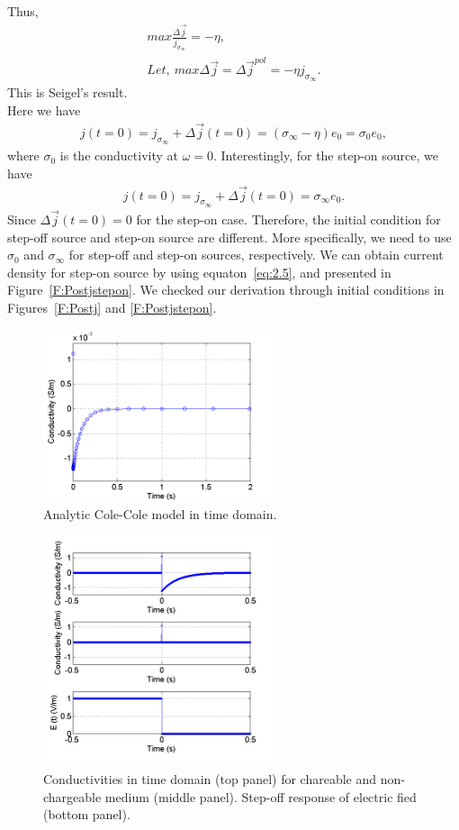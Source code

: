 \documentclass[a4paper, 11pt]{article}
\renewcommand {\j}  { {\vec j} }
\begin{document}
 Thus, 
\begin{align}
	max \frac{\Delta \j}{j_{\sigma_{\infty}}} = -\eta, \\
	Let,\ max \Delta \j = \Delta \j^{pol} = -\eta j_{\sigma_{\infty}}.
\end{align}
This is Seigel's result. \\
Here we have 
\begin{align}
	j(t=0)= j_{\sigma_{\infty}}+\Delta \j(t=0) = (\sigma_{\infty}-\eta)e_0 = \sigma_0e_0,
\end{align}
where $\sigma_0$ is the conductivity at $\omega=0$.
Interestingly, for the step-on source, we have
\begin{align}
	j(t=0)= j_{\sigma_{\infty}}+\Delta \j(t=0) = \sigma_{\infty}e_0.
\end{align}
Since $\Delta \j(t=0)=0$ for the step-on case. Therefore, the initial condition for step-off source and step-on source are different. More specifically, we need to use $\sigma_0$ and $\sigma_{\infty}$ for step-off and step-on sources, respectively. We can obtain current density for step-on source by using equaton~\ref{eq:2.5}, and presented in Figure~\ref{F:Postjstepon}. We checked our derivation through initial conditions in Figures~\ref{F:Postj} and \ref{F:Postjstepon}. 

\begin{figure}[htb]
	\centering
	\includegraphics[width=0.6\textwidth]{coleTD.png}
	\caption{Analytic Cole-Cole model in time domain.}
	\label{F:coleTD}
\end{figure}

\begin{figure}[htb]
	\centering
	\includegraphics[width=0.6\textwidth]{PreJ.png}
	\caption{Conductivities in time domain (top panel) for chareable and non-chargeable medium (middle panel). Step-off response of electric fied (bottom panel).}
	\label{F:Prej}
\end{figure}
\end{document}
